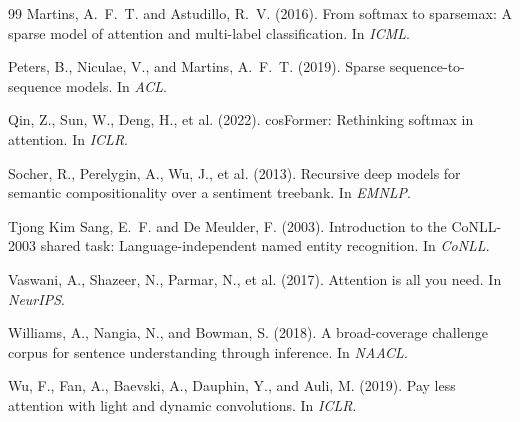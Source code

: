 \documentclass[11pt]{article}
\begin{document}
\begin{thebibliography}{99}
Martins, A.~F.~T. and Astudillo, R.~V. (2016).
\newblock From softmax to sparsemax: A sparse model of attention and multi-label classification.
\newblock In \textit{ICML}.

Peters, B., Niculae, V., and Martins, A.~F.~T. (2019).
\newblock Sparse sequence-to-sequence models.
\newblock In \textit{ACL}.

Qin, Z., Sun, W., Deng, H., et al. (2022).
\newblock cosFormer: Rethinking softmax in attention.
\newblock In \textit{ICLR}.

Socher, R., Perelygin, A., Wu, J., et al. (2013).
\newblock Recursive deep models for semantic compositionality over a sentiment treebank.
\newblock In \textit{EMNLP}.

Tjong Kim Sang, E.~F. and De Meulder, F. (2003).
\newblock Introduction to the CoNLL-2003 shared task: Language-independent named entity recognition.
\newblock In \textit{CoNLL}.

Vaswani, A., Shazeer, N., Parmar, N., et al. (2017).
\newblock Attention is all you need.
\newblock In \textit{NeurIPS}.

Williams, A., Nangia, N., and Bowman, S. (2018).
\newblock A broad-coverage challenge corpus for sentence understanding through inference.
\newblock In \textit{NAACL}.

Wu, F., Fan, A., Baevski, A., Dauphin, Y., and Auli, M. (2019).
\newblock Pay less attention with light and dynamic convolutions.
\newblock In \textit{ICLR}.

\end{thebibliography}
\end{document}
